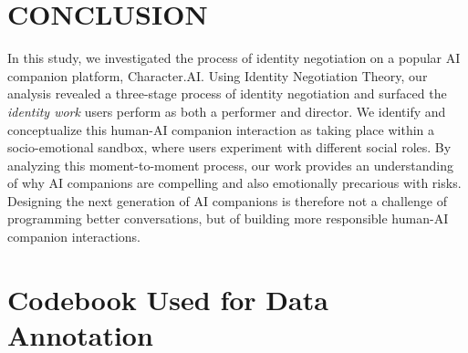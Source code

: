 \documentclass[sigconf, nonacm]{acmart}
\begin{document}
\section{CONCLUSION}
In this study, we investigated the process of identity negotiation on a popular AI companion platform, Character.AI. Using Identity Negotiation Theory, our analysis revealed a three-stage process of identity negotiation and surfaced the \textit{identity work} users perform as both a performer and director. We identify and conceptualize this human-AI companion interaction as taking place within a socio-emotional sandbox, where users experiment with different social roles. By analyzing this moment-to-moment process, our work provides an understanding of why AI companions are compelling and also emotionally precarious with risks. Designing the next generation of AI companions is therefore not a challenge of programming better conversations, but of building more responsible human-AI companion interactions.






\appendix
\onecolumn
\section{Codebook Used for Data Annotation}
\label{app:codebook}
\end{document}
